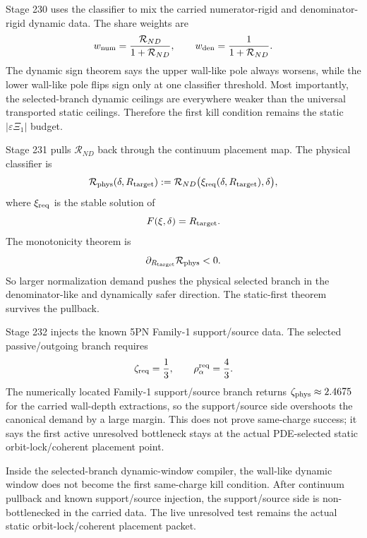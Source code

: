 Stage 230 uses the classifier to mix the carried numerator-rigid and denominator-rigid dynamic data.  The share weights are
\begin{equation}
\label{eq:part07-share-weights}
w_{\rm num}=\frac{\mathcal R_{ND}}{1+\mathcal R_{ND}},
\qquad
w_{\rm den}=\frac{1}{1+\mathcal R_{ND}}.
\end{equation}
The dynamic sign theorem says the upper wall-like pole always worsens, while the lower wall-like pole flips sign only at one classifier threshold.  Most importantly, the selected-branch dynamic ceilings are everywhere weaker than the universal transported static ceilings.  Therefore the first kill condition remains the static \(|\varepsilon\Xi_1|\) budget.

Stage 231 pulls \(\mathcal R_{ND}\) back through the continuum placement map.  The physical classifier is
\begin{equation}
\label{eq:part07-physical-classifier}
\mathcal R_{\rm phys}(\delta,R_{\rm target})
:=
\mathcal R_{ND}\bigl(\xi_{\rm req}(\delta,R_{\rm target}),\delta\bigr),
\end{equation}
where \(\xi_{\rm req}\) is the stable solution of
\begin{equation}
\label{eq:part07-f-equals-rtarget}
F(\xi,\delta)=R_{\rm target}.
\end{equation}
The monotonicity theorem is
\begin{equation}
\label{eq:part07-rphys-monotonic}
\partial_{R_{\rm target}}\mathcal R_{\rm phys}<0.
\end{equation}
So larger normalization demand pushes the physical selected branch in the denominator-like and dynamically safer direction.  The static-first theorem survives the pullback.

Stage 232 injects the known 5PN Family-1 support/source data.  The selected passive/outgoing branch requires
\begin{equation}
\label{eq:part07-zeta-req-rho-alpha}
\zeta_{\rm req}=\frac13,
\qquad
\rho_{\alpha}^{\rm req}=\frac43.
\end{equation}
The numerically located Family-1 support/source branch returns \(\zeta_{\rm phys}\approx2.4675\) for the carried wall-depth extractions, so the support/source side overshoots the canonical demand by a large margin.  This does not prove same-charge success; it says the first active unresolved bottleneck stays at the actual PDE-selected static orbit-lock/coherent placement point.

\begin{theorem}
\label{thm:part07-selected-static-first}
Inside the selected-branch dynamic-window compiler, the wall-like dynamic window does not become the first same-charge kill condition.  After continuum pullback and known support/source injection, the support/source side is non-bottlenecked in the carried data.  The live unresolved test remains the actual static orbit-lock/coherent placement packet.
\end{theorem}


